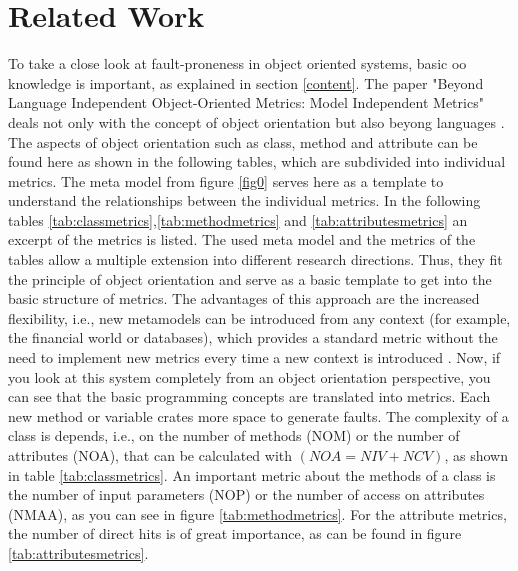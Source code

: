 \section{Related Work}

To take a close look at fault-proneness in object oriented systems, basic oo knowledge is important, as explained in section \ref{content}. The paper "Beyond Language Independent Object-Oriented Metrics: Model Independent Metrics" deals not only with the concept of object orientation but also beyong languages \cite{lanza2002beyond}. The aspects of object orientation such as class, method and attribute can be found here as shown in the following tables, which are subdivided into individual metrics. The meta model from figure \ref{fig0} serves here as a template to understand the relationships between the individual metrics. In the following tables \ref{tab:classmetrics},\ref{tab:methodmetrics} and \ref{tab:attributesmetrics} an excerpt of the metrics is listed. The used meta model and the metrics of the tables allow a multiple extension into different research directions. Thus, they fit the principle of object orientation and serve as a basic template to get into the basic structure of metrics. The advantages of this approach are the increased flexibility, i.e.,
new metamodels can be introduced from any context (for example, the financial world or databases), which provides a standard metric without the need to implement new metrics every time a new context is introduced \cite{lanza2002beyond}. Now, if you look at this system completely from an object orientation perspective, you can see that the basic programming concepts are translated into metrics. Each new method or variable crates more space to generate faults. The complexity of a class is depends, i.e., on the number of methods (NOM) or the number of attributes (NOA), that can be calculated with $(NOA = NIV + NCV)$, as shown in table \ref{tab:classmetrics}. An important metric about the methods of a class is the number of input parameters (NOP) or the number of access on attributes (NMAA), as you can see in figure \ref{tab:methodmetrics}. For the attribute metrics, the number of direct hits is of great importance, as can be found in figure \ref{tab:attributesmetrics}. 

